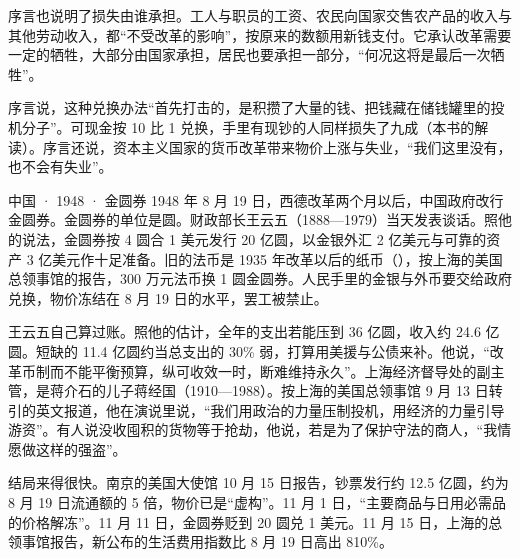 序言也说明了损失由谁承担。工人与职员的工资、农民向国家交售农产品的收入与其他劳动收入，都“不受改革的影响”，按原来的数额用新钱支付\cite{ussr1947}。它承认改革需要一定的牺牲，大部分由国家承担，居民也要承担一部分，“何况这将是最后一次牺牲”\cite{ussr1947}。

序言说，这种兑换办法“首先打击的，是积攒了大量的钱、把钱藏在储钱罐里的投机分子”\cite{ussr1947}。可现金按 10 比 1 兑换，手里有现钞的人同样损失了九成（本书的解读）。序言还说，资本主义国家的货币改革带来物价上涨与失业，“我们这里没有，也不会有失业”\cite{ussr1947}。

\begin{case}{中国 · 1948 · 金圆券}
1948 年 8 月 19 日，西德改革两个月以后，中国政府改行金圆券。金圆券的单位是圆。财政部长王云五（1888—1979）当天发表谈话\cite{wang1948,loc35}。照他的说法，金圆券按 4 圆合 1 美元发行 20 亿圆，以金银外汇 2 亿美元与可靠的资产 3 亿美元作十足准备\cite{wang1948}。旧的法币是 1935 年改革以后的纸币（），按上海的美国总领事馆的报告，300 万元法币换 1 圆金圆券\cite{frus1948cn}。人民手里的金银与外币要交给政府兑换，物价冻结在 8 月 19 日的水平，罢工被禁止\cite{wang1948,frus1948cn}。

王云五自己算过账。照他的估计，全年的支出若能压到 36 亿圆，收入约 24.6 亿圆\cite{wang1948}。短缺的 11.4 亿圆约当总支出的 30\% 弱，打算用美援与公债来补\cite{wang1948}。他说，“改革币制而不能平衡预算，纵可收效一时，断难维持永久”\cite{wang1948}。上海经济督导处的副主管，是蒋介石的儿子蒋经国（1910—1988）\cite{frus1948cn,loc35}。按上海的美国总领事馆 9 月 13 日转引的英文报道，他在演说里说，“我们用政治的力量压制投机，用经济的力量引导游资”\cite{frus1948cn}。有人说没收囤积的货物等于抢劫，他说，若是为了保护守法的商人，“我情愿做这样的强盗”\cite{frus1948cn}。

结局来得很快。南京的美国大使馆 10 月 15 日报告，钞票发行约 12.5 亿圆，约为 8 月 19 日流通额的 5 倍，物价已是“虚构”\cite{frus1948cn}。11 月 1 日，“主要商品与日用必需品的价格解冻”\cite{frus1948cn}。11 月 11 日，金圆券贬到 20 圆兑 1 美元\cite{frus1948cn}。11 月 15 日，上海的总领事馆报告，新公布的生活费用指数比 8 月 19 日高出 810\%\cite{frus1948cn}。
\end{case}

